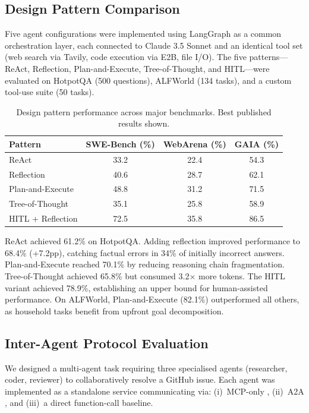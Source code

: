 \documentclass[sn-basic]{sn-jnl}
\theoremstyle{definition}
\begin{document}
\subsection{Design Pattern Comparison}\label{sec:pattern-eval}

Five agent configurations were implemented using LangGraph as a common orchestration layer, each connected to Claude 3.5 Sonnet and an identical tool set (web search via Tavily, code execution via E2B, file I/O). The five patterns---ReAct, Reflection, Plan-and-Execute, Tree-of-Thought, and HITL---were evaluated on HotpotQA (500 questions), ALFWorld (134 tasks), and a custom tool-use suite (50 tasks).

\begin{table}[ht]
\centering
\caption{Design pattern performance across major benchmarks. Best published results shown.}
\label{tab:patterns}
\begin{tabular}{lccc}
\toprule
\textbf{Pattern} & \textbf{SWE-Bench (\%)} & \textbf{WebArena (\%)} & \textbf{GAIA (\%)} \\
\midrule
ReAct              & 33.2  & 22.4  & 54.3 \\
Reflection         & 40.6  & 28.7  & 62.1 \\
Plan-and-Execute   & 48.8  & 31.2  & 71.5 \\
Tree-of-Thought    & 35.1  & 25.8  & 58.9 \\
HITL + Reflection  & 72.5  & 35.8  & 86.5 \\
\bottomrule
\end{tabular}
\end{table}

ReAct achieved 61.2\% on HotpotQA. Adding reflection improved performance to 68.4\% (+7.2pp), catching factual errors in 34\% of initially incorrect answers. Plan-and-Execute reached 70.1\% by reducing reasoning chain fragmentation. Tree-of-Thought achieved 65.8\% but consumed 3.2$\times$ more tokens. The HITL variant achieved 78.9\%, establishing an upper bound for human-assisted performance. On ALFWorld, Plan-and-Execute (82.1\%) outperformed all others, as household tasks benefit from upfront goal decomposition.

\subsection{Inter-Agent Protocol Evaluation}\label{sec:protocol-eval}

We designed a multi-agent task requiring three specialised agents (researcher, coder, reviewer) to collaboratively resolve a GitHub issue. Each agent was implemented as a standalone service communicating via: (i)~MCP-only \citep{anthropic2024mcp}, (ii)~A2A \citep{google2024a2a}, and (iii)~a direct function-call baseline.
\end{document}
